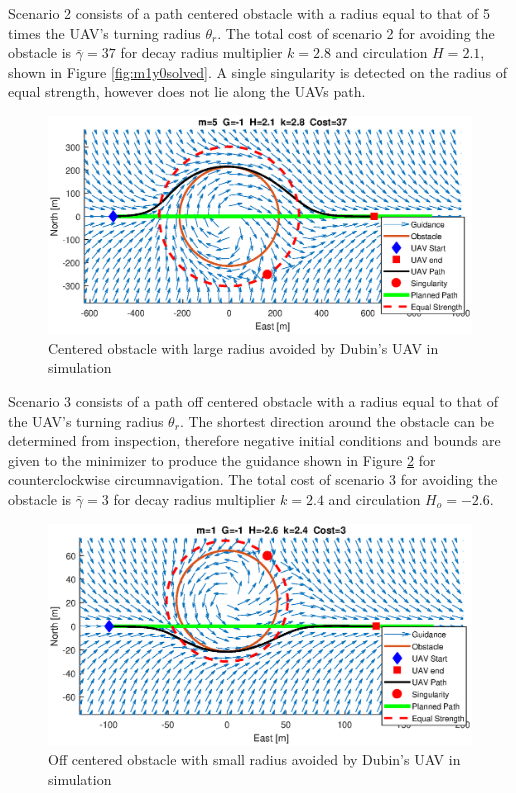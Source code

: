 \documentclass[numbered,pdftex]{ohio-etd}
\begin{document}
Scenario 2 consists of a path centered obstacle with a radius equal to that of 5 times the UAV's turning radius $\theta_r$. The total cost of scenario 2 for avoiding the obstacle is $\bar{\gamma}=37$ for decay radius multiplier $k=2.8$ and circulation $H = 2.1$, shown in Figure \ref{fig:m1y0solved}. A single singularity is detected on the radius of equal strength, however does not lie along the UAVs path.


\begin{figure}[H]
	\centering
	\includegraphics[trim = 0 85 0 85, clip, width=16cm]{Figures/results/m5Y0Solved}
	\caption{Centered obstacle with large radius avoided by Dubin's UAV in simulation}
	\label{fig:m5y0solved}
\end{figure}

Scenario 3 consists of a path off centered obstacle with a radius equal to that of the UAV's turning radius $\theta_r$. The shortest direction around the obstacle can be determined from inspection, therefore negative initial conditions and bounds are given to the minimizer to produce the guidance shown in Figure \ref{fig:m1y05} for counterclockwise circumnavigation. The total cost of scenario 3 for avoiding the obstacle is $\bar{\gamma}=3$ for decay radius multiplier $k=2.4$ and circulation $H_o = -2.6$.



\begin{figure}[H]
	\centering
	\includegraphics[trim = 0 85 0 85, clip, width=16cm]{Figures/results/m1Y05}
	\caption{Off centered obstacle with small radius avoided by Dubin's UAV in simulation}
	\label{fig:m1y05}
\end{figure}
\end{document}
